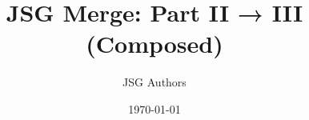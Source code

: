 \documentclass[11pt]{article}
\title{JSG Merge: Part II → III (Composed)}
\author{JSG Authors}
\date{\today}
\begin{document}
\maketitle

\newcommand{\JSGWrap}{C}


























\nocite{*}
\printbibliography
\end{document}
